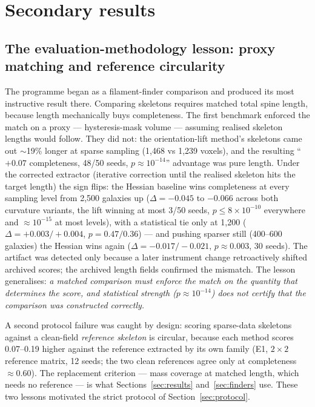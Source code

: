 \documentclass[11pt]{article}
\begin{document}
\section{Secondary results}
\label{sec:secondary}

\subsection{The evaluation-methodology lesson: proxy matching and reference circularity}
\label{sec:lesson}

The programme began as a filament-finder comparison and produced its most instructive result there. Comparing skeletons requires matched total spine length, because length mechanically buys completeness. The first benchmark enforced the match on a proxy --- hysteresis-mask volume --- assuming realised skeleton lengths would follow. They did not: the orientation-lift method's skeletons came out $\sim$19\% longer at sparse sampling (1,468 vs 1,239 voxels), and the resulting ``$+0.07$ completeness, 48/50 seeds, $p \approx 10^{-14}$'' advantage was pure length. Under the corrected extractor (iterative correction until the realised skeleton hits the target length) the sign flips: the Hessian baseline wins completeness at every sampling level from 2,500 galaxies up ($\Delta = -0.045$ to $-0.066$ across both curvature variants, the lift winning at most 3/50 seeds, $p \leq 8\times10^{-10}$ everywhere and $\approx 10^{-15}$ at most levels), with a statistical tie only at 1,200 ($\Delta = +0.003/+0.004$, $p = 0.47/0.36$) --- and pushing sparser still (400--600 galaxies) the Hessian wins again ($\Delta = -0.017/-0.021$, $p \approx 0.003$, 30 seeds). The artifact was detected only because a later instrument change retroactively shifted archived scores; the archived length fields confirmed the mismatch. The lesson generalises: \emph{a matched comparison must enforce the match on the quantity that determines the score, and statistical strength ($p \approx 10^{-14}$) does not certify that the comparison was constructed correctly.}

A second protocol failure was caught by design: scoring sparse-data skeletons against a clean-field \emph{reference skeleton} is circular, because each method scores 0.07--0.19 higher against the reference extracted by its own family (E1, $2\times2$ reference matrix, 12 seeds; the two clean references agree only at completeness $\approx 0.60$). The replacement criterion --- mass coverage at matched length, which needs no reference --- is what Sections~\ref{sec:results} and~\ref{sec:finders} use. These two lessons motivated the strict protocol of Section~\ref{sec:protocol}.
\end{document}
